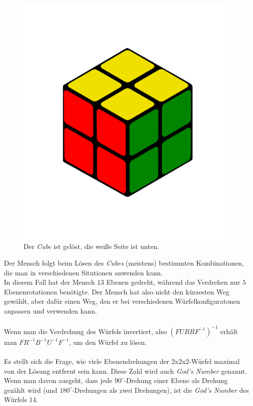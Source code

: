 \documentclass[12pt,a4paper, usenames, dvipsnames]{article}
\begin{document}
\begin{figure}[H]
\centering
\includegraphics[scale=0.12]{menschSchritt5.png}
\caption[Lösung von Mensch: Schritt 5]{Der \textit{Cube} ist gelöst, die weiße Seite ist unten.}
\end{figure}

Der Mensch folgt beim Lösen des \textit{Cubes} (meistens) bestimmten Kombinationen, die man in verschiedenen Situtionen anwenden kann. \\
In diesem Fall hat der Mensch $13$ Ebenen gedreht, während das Verdrehen nur $5$ Ebenenrotationen benötigte. Der Mensch hat also nicht den kürzesten Weg gewählt, aber dafür einen Weg, den er bei verschiedenen Würfelkonfiguratonen anpassen und verwenden kann. \\
\\
Wenn man die Verdrehung des Würfels invertiert, also $(FUBRF^{-1})^{-1}$ erhält man $FR^{-1}B^{-1}U^{-1}F^{-1}$, um den Würfel zu lösen.
\\
\\
Es stellt sich die Frage, wie viele Ebenendrehungen der 2x2x2-Würfel maximal von der Lösung entfernt sein kann. Diese Zahl wird auch \textit{God's Number} genannt. \\
Wenn man davon ausgeht, dass jede $90^\circ$-Drehung einer Ebene als Drehung gezählt wird (und $180^\circ$-Drehungen als zwei Drehungen), ist die \textit{God's Number} des Würfels $14$. \cite{DJ} 
\end{document}
